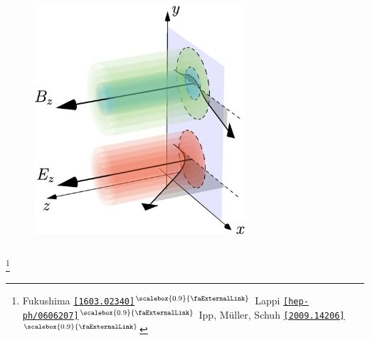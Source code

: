 \documentclass[aspectratio=169,11pt,usenames,dvipsnames]{beamer}
\renewcommand{\thefootnote}{\color{customblue}\faPaperPlaneO}
\newcommand\blfootnote[1]{%
  \begingroup
  \renewcommand\thefootnote{}\footnote{#1}%
  \addtocounter{footnote}{-1}%
  \endgroup
}
\begin{document}
\begin{frame}
\begin{columns}[onlytextwidth,t]
        \begin{center}
            \begin{figure}
                \centering
                \includegraphics[width=0.7\textwidth]{images/1-s2.0-S0370269320306134-gr003_lrg.jpg}
            \end{figure}
        \end{center}

    \end{columns}
    \blfootnote{\scriptsize Fukushima \href{https://arxiv.org/abs/1603.02340}{{\color{palteal}\texttt{[1603.02340]}$^\text{\scalebox{0.9}{\faExternalLink}}$}} Lappi \href{https://arxiv.org/abs/hep-ph/0606207}{{\color{palviolet}\texttt{[hep-ph/0606207]}$^\text{\scalebox{0.9}{\faExternalLink}}$}} Ipp, Müller, Schuh \href{https://arxiv.org/abs/2009.14206}{{\color{palgold}\texttt{[2009.14206]}$^\text{\scalebox{0.9}{\faExternalLink}}$}}
    }
\end{frame}
\end{document}

